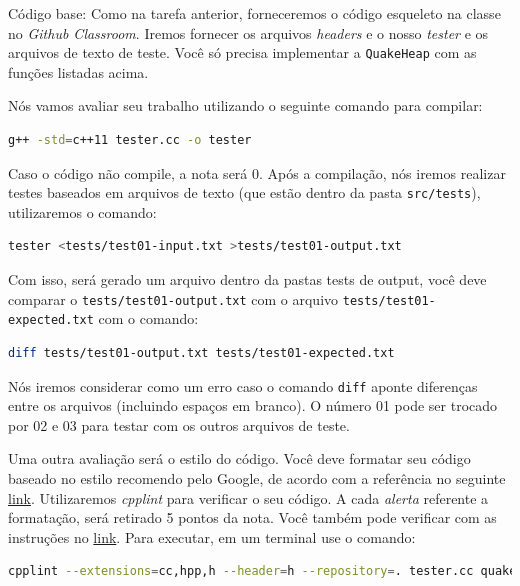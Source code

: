 \documentclass{article}
\begin{document}
Código base: Como na tarefa anterior, forneceremos o código esqueleto na classe no \textit{Github Classroom}. Iremos fornecer os arquivos \textit{headers} e o nosso \textit{tester} e os arquivos de texto de teste. Você só precisa implementar a \texttt{QuakeHeap} com as funções listadas acima. 

Nós vamos avaliar seu trabalho utilizando o seguinte comando para compilar:
\begin{lstlisting}[language=bash]
g++ -std=c++11 tester.cc -o tester
\end{lstlisting}

Caso o código não compile, a nota será 0.
Após a compilação, nós iremos realizar testes baseados em arquivos de texto (que estão dentro da pasta \texttt{src/tests}), utilizaremos o comando:

\begin{lstlisting}[language=bash]
tester <tests/test01-input.txt >tests/test01-output.txt
\end{lstlisting}
    
Com isso, será gerado um arquivo dentro da pastas tests de output, você deve comparar o \texttt{tests/test01-output.txt} com o arquivo \texttt{tests/test01-expected.txt} com o comando:

\begin{lstlisting}[language=bash]
diff tests/test01-output.txt tests/test01-expected.txt
\end{lstlisting}

Nós iremos considerar como um erro caso o comando \texttt{diff} aponte diferenças entre os arquivos (incluindo espaços em branco). 
O número 01 pode ser trocado por 02 e 03 para testar com os outros arquivos de teste. 

Uma outra avaliação será o estilo do código. Você deve formatar seu código baseado no estilo recomendo pelo  Google, de acordo com a referência no seguinte \href{https://google.github.io/styleguide/cppguide.html}{link}. 
%
Utilizaremos \textit{cpplint} para verificar o seu código. A cada \textit{alerta} referente a formatação, será retirado 5 pontos da nota. Você também pode verificar com as instruções no \href{https://github.com/cpplint/cpplint}{link}. Para executar, em um terminal use o comando:  

\begin{lstlisting}[language=bash]
cpplint --extensions=cc,hpp,h --header=h --repository=. tester.cc quake_heap.h quake_heap.hpp
\end{lstlisting}
\end{document}
